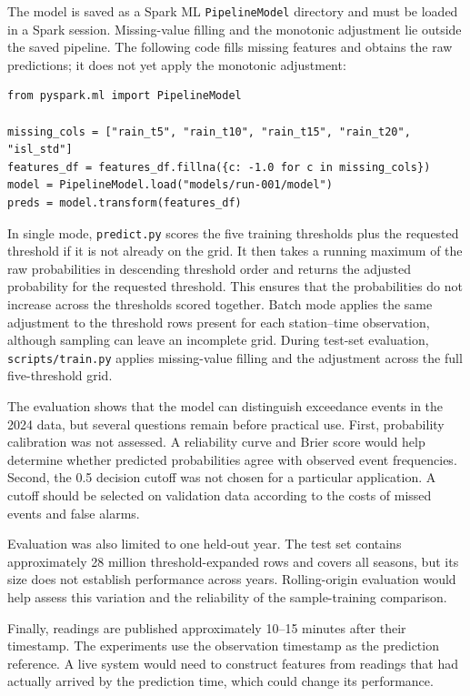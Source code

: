 \documentclass[11pt]{article}
\begin{document}
The model is saved as a Spark ML \texttt{PipelineModel} directory and must be loaded in a Spark session. Missing-value filling and the monotonic adjustment lie outside the saved pipeline. The following code fills missing features and obtains the raw predictions; it does not yet apply the monotonic adjustment:

\begin{verbatim}
from pyspark.ml import PipelineModel

missing_cols = ["rain_t5", "rain_t10", "rain_t15", "rain_t20", "isl_std"]
features_df = features_df.fillna({c: -1.0 for c in missing_cols})
model = PipelineModel.load("models/run-001/model")
preds = model.transform(features_df)
\end{verbatim}

In single mode, \texttt{predict.py} scores the five training thresholds plus the requested threshold if it is not already on the grid. It then takes a running maximum of the raw probabilities in descending threshold order and returns the adjusted probability for the requested threshold. This ensures that the probabilities do not increase across the thresholds scored together. Batch mode applies the same adjustment to the threshold rows present for each station--time observation, although sampling can leave an incomplete grid. During test-set evaluation, \texttt{scripts/train.py} applies missing-value filling and the adjustment across the full five-threshold grid.

The evaluation shows that the model can distinguish exceedance events in the 2024 data, but several questions remain before practical use. First, probability calibration was not assessed. A reliability curve and Brier score would help determine whether predicted probabilities agree with observed event frequencies. Second, the 0.5 decision cutoff was not chosen for a particular application. A cutoff should be selected on validation data according to the costs of missed events and false alarms.

Evaluation was also limited to one held-out year. The test set contains approximately 28 million threshold-expanded rows and covers all seasons, but its size does not establish performance across years. Rolling-origin evaluation would help assess this variation and the reliability of the sample-training comparison.

Finally, readings are published approximately 10--15 minutes after their timestamp. The experiments use the observation timestamp as the prediction reference. A live system would need to construct features from readings that had actually arrived by the prediction time, which could change its performance.
\end{document}
